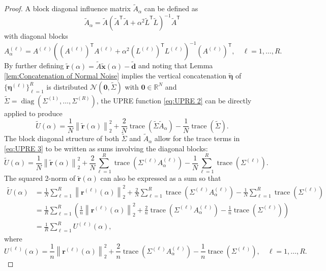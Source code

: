 \documentclass[12pt]{article}
\newcommand{\dVec}{\mathbf{d}}	%
\newcommand{\rVec}{\mathbf{r}}	%
\newcommand{\xVec}{\mathbf{x}}	%
\newcommand{\trans}[1]{{#1}^\mathsf{T}}	%
\DeclareMathOperator{\trace}{trace}		%
\DeclareMathOperator{\diag}{diag}	%
\newcommand{\regparam}{\alpha}  %
\newcommand{\noise}{\eta}	%
\newcommand{\noiseVec}{\bm{\noise}}	%
\newcommand{\zeroVec}{\bm{0}}	%
\newcommand{\U}{U}	%
\begin{document}
\begin{proof}
A block diagonal influence matrix $\widetilde{A}_\regparam$ can be defined as
\[\widetilde{A}_\regparam = \widetilde{A}(\trans{\widetilde{A}}\widetilde{A} + \regparam^2\trans{\widetilde{L}}\widetilde{L})^{-1}\trans{\widetilde{A}}\]
with diagonal blocks
\begin{equation}
\label{eq:Diagonal blocks}
A^{(\ell)}_\regparam = A^{(\ell)}\left(\trans{\left(A^{(\ell)}\right)}A^{(\ell)} + \regparam^2\trans{\left(L^{(\ell)}\right)}L^{(\ell)}\right)^{-1}\trans{\left(A^{(\ell)}\right)}, \quad \ell = 1,\ldots,R.
\end{equation}
By further defining $\widetilde{\rVec}(\regparam) = \widetilde{A}\widetilde{\xVec}(\regparam) - \widetilde{\dVec}$ and noting that Lemma \ref{lem:Concatenation of Normal Noise} implies the vertical concatenation $\widetilde{\noiseVec}$ of $\{\noiseVec^{(\ell)}\}_{\ell=1}^R$ is distributed $\mathcal{N}(\zeroVec,\widetilde{\Sigma})$ with $\zeroVec \in \mathbb{R}^N$ and $\widetilde{\Sigma} = \diag(\Sigma^{(1)},\ldots,\Sigma^{(R)})$, the UPRE function \eqref{eq:UPRE 2} can be directly applied to produce
\begin{equation}
\label{eq:UPRE 3}
\widetilde{\U}(\regparam) = \frac{1}{N}\left\|\widetilde{\rVec}(\regparam)\right\|_2^2 + \frac{2}{N}\trace\left(\widetilde{\Sigma}\widetilde{A}_\regparam\right) - \frac{1}{N}\trace\left(\widetilde{\Sigma}\right).
\end{equation}
The block diagonal structure of both $\widetilde{\Sigma}$ and $\widetilde{A}_\regparam$ allow for the trace terms in \eqref{eq:UPRE 3} to be written as sums involving the diagonal blocks:
\begin{equation}
\label{eq:UPRE 4}
\widetilde{\U}(\regparam) = \frac{1}{N}\left\|\widetilde{\rVec}(\regparam)\right\|_2^2 + \frac{2}{N} \sum_{\ell=1}^R \trace\left(\Sigma^{(\ell)}A^{(\ell)}_\regparam\right) - \frac{1}{N} \sum_{\ell=1}^R \trace\left(\Sigma^{(\ell)}\right).
\end{equation}
The squared 2-norm of $\widetilde{\rVec}(\regparam)$ can also be expressed as a sum so that
\begin{align*}
\widetilde{\U}(\regparam) &= \frac{1}{N} \sum_{\ell=1}^R \left\|\rVec^{(\ell)}(\regparam)\right\|_2^2 + \frac{2}{N} \sum_{\ell=1}^R \trace\left(\Sigma^{(\ell)} A_\regparam^{(\ell)}\right) - \frac{1}{N} \sum_{\ell=1}^R \trace\left(\Sigma^{(\ell)}\right) \\
&= \frac{1}{R} \sum_{\ell=1}^R \left(\frac{1}{n}\left\|\rVec^{(\ell)}(\regparam)\right\|_2^2 + \frac{2}{n} \trace\left(\Sigma^{(\ell)} A_\regparam^{(\ell)}\right) - \frac{1}{n} \trace\left(\Sigma^{(\ell)}\right)\right) \\
&= \frac{1}{R} \sum_{\ell=1}^R \U^{(\ell)}(\regparam),
\end{align*}
where
\[\U^{(\ell)}(\regparam) = \frac{1}{n}\left\|\rVec^{(\ell)}(\regparam)\right\|_2^2 + \frac{2}{n} \trace\left(\Sigma^{(\ell)} A_\regparam^{(\ell)}\right) - \frac{1}{n} \trace\left(\Sigma^{(\ell)}\right), \quad \ell = 1,\ldots,R.\]
\end{proof}
\end{document}
